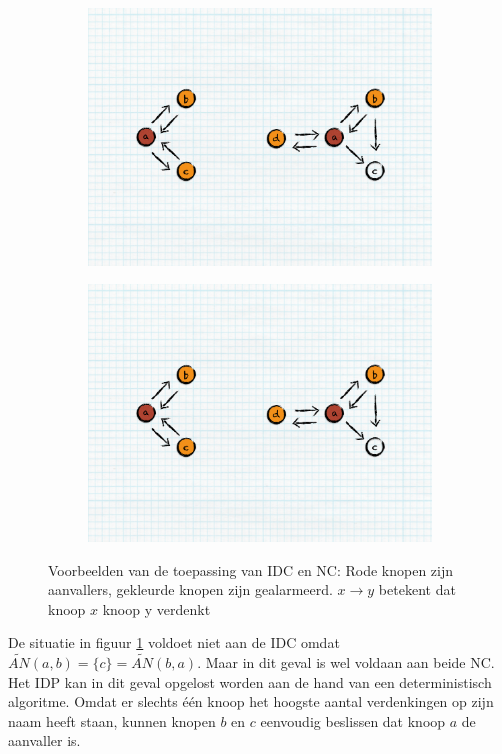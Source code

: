 \begin{figure}[ht]
\centering
\begin{subfigure}{.49\textwidth}
  \centering
  \includegraphics[width=.8\linewidth]{./resources/idp-nc-s1.pdf}
  \caption{}
  \label{fig:idp-examples-1}
\end{subfigure}
\begin{subfigure}{.49\textwidth}
  \centering
  \includegraphics[width=.8\linewidth]{./resources/idp-nc-s2.pdf}
  \caption{}
  \label{fig:idp-examples-2}
\end{subfigure}
\caption[Voorbeelden van de toepassing van IDC en NC]{Voorbeelden van de
toepassing van IDC en NC: Rode knopen zijn aanvallers, gekleurde knopen zijn
gealarmeerd. $x \rightarrow y$ betekent dat knoop $x$ knoop y verdenkt}
\label{fig:idp-examples}
\end{figure}

De situatie in figuur \ref{fig:idp-examples-1} voldoet niet aan de IDC omdat
$\tilde{AN}(a,b) = \{c\} = \tilde{AN}(b,a)$. Maar in dit geval is wel voldaan
aan beide NC. Het IDP kan in dit geval opgelost worden aan de hand van een
deterministisch algoritme. Omdat er slechts \'e\'en knoop het hoogste aantal
verdenkingen op zijn naam heeft staan, kunnen knopen $b$ en $c$ eenvoudig
beslissen dat knoop $a$ de aanvaller is.


